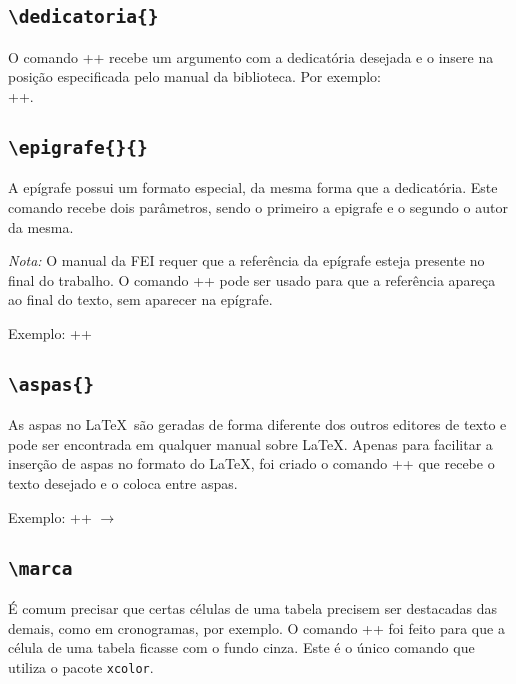 \documentclass[xindy,draft]{fei}
\begin{document}
    \subsection{\texttt{\textbackslash dedicatoria\{\}}}
    O comando \latexinline+\dedicatoria{}+ recebe um argumento com a dedicatória desejada e o insere na posição especificada pelo manual da biblioteca. Por exemplo: \\ \latexinline++.
    
    \subsection{\texttt{\textbackslash epigrafe\{\}\{\}}}
    A epígrafe possui um formato especial, da mesma forma que a dedicatória. Este comando recebe dois parâmetros, sendo o primeiro a epigrafe e o segundo o autor da mesma.
    
    \emph{Nota:} O manual da FEI requer que a referência da epígrafe esteja presente no final do trabalho. O comando \latexinline+\nocite{obra}+ pode ser usado para que a referência apareça ao final do texto, sem aparecer na epígrafe.
    
    Exemplo: \latexinline++
    
    \subsection{\texttt{\textbackslash aspas\{\}}}
    As aspas no \LaTeX\ são geradas de forma diferente dos outros editores de texto e pode ser encontrada em qualquer manual sobre \LaTeX. Apenas para facilitar a inserção de aspas no formato do \LaTeX, foi criado o comando \latexinline+\aspas{}+ que recebe o texto desejado e o coloca entre aspas.

    Exemplo: \latexinline++ $\to$ 
    
    \subsection{\texttt{\textbackslash marca}}
    É comum precisar que certas células de uma tabela precisem ser destacadas das demais, como em cronogramas, por exemplo. O comando \latexinline+\marca+ foi feito para que a célula de uma tabela ficasse com o fundo cinza. Este é o único comando que utiliza o pacote \texttt{xcolor}.
\end{document}

